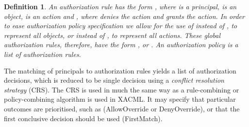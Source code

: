 \documentclass{article}
\newtheorem{definition}{Definition}
\begin{document}
\begin{definition}
    An \emph{authorization rule} has the form , where  is a principal,  is an object,  is an action and , where  denies the action and  grants the action.
    In order to ease authorization policy specification we allow for the use of  instead of , to represent all objects, or instead of , to represent all actions.
    These global authorization rules, therefore, have the form ,  or .
    An \emph{authorization policy} is a list of authorization rules.
\end{definition}

The matching of principals to authorization rules yields a list of authorization decisions, which is reduced to be single decision using a \emph{conflict resolution strategy} (CRS).
The CRS is used in much the same way as a rule-combining or policy-combining algorithm is used in XACML.
It may specify that particular outcomes are prioritised, such as (\textsf{AllowOverride} or \textsf{DenyOverride}), or that the first conclusive decision should be used (\textsf{FirstMatch}).
\end{document}
